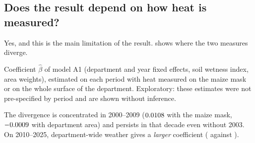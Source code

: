\subsection{Does the result depend on how heat is measured?}
\label{subsec:maize-measure}

Yes, and this is the main limitation of the result.  shows where the two measures diverge.

\begin{table}[H]
\centering
\small
\caption{Maize: coefficient by heat measure and period (point estimates, exploratory, no inference)}
\label{tab:maize-measure}
\begin{threeparttable}

\begin{tablenotes}\footnotesize
\item Coefficient $\hat\beta$ of model A1 (department and year fixed effects, soil wetness index, area weights), estimated on each period with heat measured on the maize mask or on the whole surface of the department. Exploratory: these estimates were not pre-specified by period and are shown without inference.
\end{tablenotes}
\end{threeparttable}
\end{table}

The divergence is concentrated in 2000--2009 ($0.0108$ with the maize mask, $-0.0009$ with department area) and persists in that decade even without 2003. On 2010--2025, department-wide weather gives a \emph{larger} coefficient (\AreaRecent{} against \MaskRecent).

